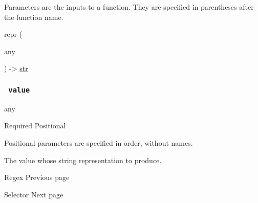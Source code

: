 \label{parameters-tooltip}
Parameters are the inputs to a function. They are specified in
parentheses after the function name.

{ repr } (

{ { any } }

) -\textgreater{} \href{/docs/reference/foundations/str/}{str}

\subsubsection{\texorpdfstring{\texttt{\ value\ }}{ value }}\label{parameters-value}

{ any }

{Required} {{ Positional }}

\label{parameters-value-positional-tooltip}
Positional parameters are specified in order, without names.

The value whose string representation to produce.

\href{/docs/reference/foundations/regex/}{\pandocbounded{}}

{ Regex } { Previous page }

\href{/docs/reference/foundations/selector/}{\pandocbounded{}}

{ Selector } { Next page }
